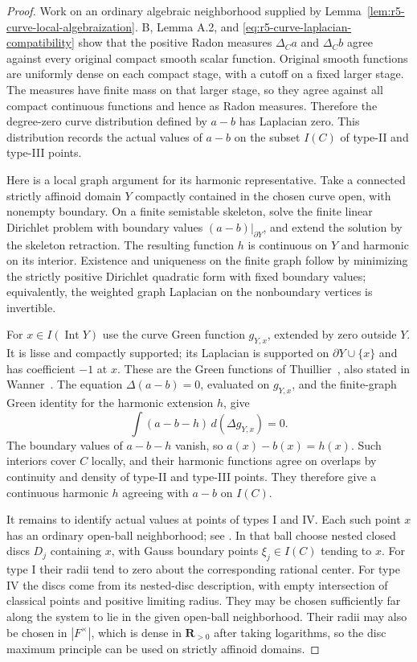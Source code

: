 \documentclass[11pt,a4paper]{article}
\numberwithin{equation}{section}
\theoremstyle{definition}
\theoremstyle{remark}
\begin{document}
\begin{proof}
Work on an ordinary algebraic neighborhood supplied by
Lemma~\ref{lem:r5-curve-local-algebraization}.  B, Lemma A.2, and
\eqref{eq:r5-curve-laplacian-compatibility} show that the positive
Radon measures $\Delta_C a$ and $\Delta_C b$ agree against every
original compact smooth scalar function.  Original smooth functions
are uniformly dense on each compact stage, with a cutoff on a fixed
larger stage.  The measures have finite mass on that larger stage,
so they agree against all compact continuous functions and hence as
Radon measures.  Therefore the degree-zero curve distribution
defined by $a-b$ has Laplacian zero.  This distribution records the
actual values of $a-b$ on the subset $I(C)$ of type-II and type-III
points.

Here is a local graph argument for its harmonic representative.
Take a connected strictly affinoid domain $Y$ compactly contained
in the chosen curve open, with nonempty boundary.  On a finite
semistable skeleton, solve the finite linear Dirichlet problem with
boundary values $(a-b)|_{\partial Y}$, and extend the solution by
the skeleton retraction.  The resulting function $h$ is continuous
on $Y$ and harmonic on its interior.  Existence and uniqueness on
the finite graph follow by minimizing the strictly positive
Dirichlet quadratic form with fixed boundary values; equivalently,
the weighted graph Laplacian on the nonboundary vertices is
invertible.

For $x\in I(\operatorname{Int}Y)$ use the curve Green function
$g_{Y,x}$, extended by zero outside $Y$.  It is lisse and compactly
supported; its Laplacian is supported on $\partial Y\cup\{x\}$
and has coefficient $-1$ at $x$.  These are the Green functions of
Thuillier~\cite[Proposition~3.3.7 and Corollary~3.3.9]{Thu05},
also stated in Wanner~\cite[Proposition~2.12]{Wan19}.
The equation $\Delta(a-b)=0$, evaluated on $g_{Y,x}$, and the
finite-graph Green identity for the harmonic extension $h$, give
\[
              \int (a-b-h)\,d(\Delta g_{Y,x})=0.
\]
The boundary values of $a-b-h$ vanish, so $a(x)-b(x)=h(x)$.
Such interiors cover $C$ locally, and their harmonic functions agree
on overlaps by continuity and density of type-II and type-III
points.  They therefore give a continuous harmonic $h$ agreeing
with $a-b$ on $I(C)$.

It remains to identify actual values at points of types I and IV.
Each such point $x$ has an ordinary open-ball neighborhood; see
\cite[Theorem~2.11]{Wan22}.  In that ball choose nested closed
discs $D_j$ containing $x$, with Gauss boundary points
$\xi_j\in I(C)$ tending to $x$.  For type I their radii tend to
zero about the corresponding rational center.  For type IV the
discs come from its nested-disc description, with empty
intersection of classical points and positive limiting radius.
They may be chosen sufficiently far along the system to lie in
the given open-ball neighborhood.  Their radii may also be chosen
in $|F^\times|$, which is dense in $\mathbf R_{>0}$ after taking
logarithms, so the disc maximum principle can be used on strictly
affinoid domains.


\end{proof}
\end{document}
